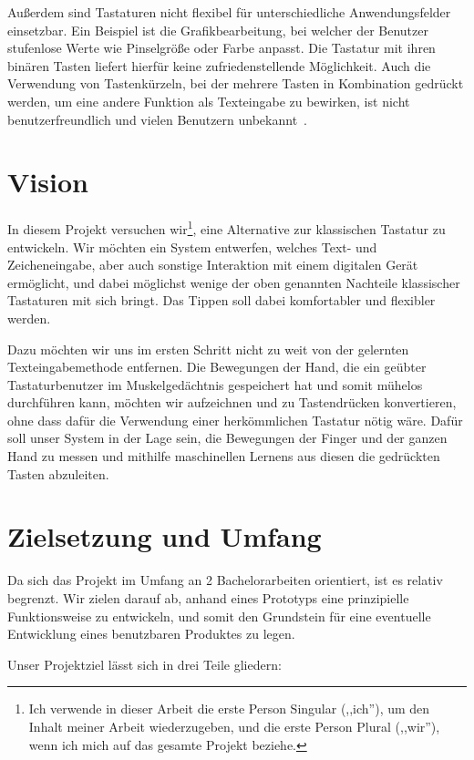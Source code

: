 Außerdem sind Tastaturen nicht flexibel für unterschiedliche Anwendungsfelder
einsetzbar. Ein Beispiel ist die Grafikbearbeitung, bei welcher der Benutzer
stufenlose Werte wie Pinselgröße oder Farbe anpasst. Die Tastatur mit ihren
binären Tasten liefert hierfür keine zufriedenstellende Möglichkeit.  Auch die
Verwendung von Tastenkürzeln, bei der mehrere Tasten in Kombination gedrückt
werden, um eine andere Funktion als Texteingabe zu bewirken, ist nicht
benutzerfreundlich und vielen Benutzern
unbekannt~\citep{lane-keyboard-shortcuts}.

\section{Vision} 

In diesem Projekt versuchen wir\footnote{Ich verwende in dieser Arbeit die
erste Person Singular (,,ich''), um den Inhalt meiner Arbeit wiederzugeben, und
die erste Person Plural (,,wir''), wenn ich mich auf das gesamte Projekt
beziehe.}, eine Alternative zur klassischen Tastatur zu entwickeln. Wir möchten
ein System entwerfen, welches Text- und Zeicheneingabe, aber auch sonstige
Interaktion mit einem digitalen Gerät ermöglicht, und dabei möglichst wenige
der oben genannten Nachteile klassischer Tastaturen mit sich bringt. Das Tippen
soll dabei komfortabler und flexibler werden.

Dazu möchten wir uns im ersten Schritt nicht zu weit von der gelernten
Texteingabemethode entfernen. Die Bewegungen der Hand, die ein geübter
Tastaturbenutzer im Muskelgedächtnis gespeichert hat und somit mühelos
durchführen kann, möchten wir aufzeichnen und zu Tastendrücken konvertieren,
ohne dass dafür die Verwendung einer herkömmlichen Tastatur nötig wäre. Dafür
soll unser System in der Lage sein, die Bewegungen der Finger und der ganzen
Hand zu messen und mithilfe maschinellen Lernens aus diesen die gedrückten
Tasten abzuleiten.

\section{Zielsetzung und Umfang}

Da sich das Projekt im Umfang an 2 Bachelorarbeiten orientiert, ist es relativ
begrenzt. Wir zielen darauf ab, anhand eines Prototyps eine prinzipielle
Funktionsweise zu entwickeln, und somit den Grundstein für eine eventuelle
Entwicklung eines benutzbaren Produktes zu legen.

Unser Projektziel lässt sich in drei Teile gliedern:

